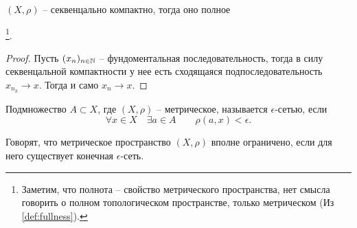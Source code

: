 \begin{theorem}
    $(X, \rho)$ -- секвенцально компактно, тогда оно полное\addtocounter{footnote}{1}\footnote{Заметим, что полнота -- свойство метрического пространства, нет смысла говорить о полном топологическом пространстве, только метрическом (Из \cref{def:fullness}).}.
\end{theorem}
\begin{proof}
    Пусть $(x_n)_{n\in\mathbb N}$ -- фундоментальная последовательность, тогда в силу секвенцальной компактности у нее есть сходящаяся подпоследовательность $x_{n_k}\to x$. Тогда и само $x_n \to x.$
\end{proof}
\begin{definition}
    Подмножество $A\subset X$, где $(X, \rho)$ -- метрическое, называется $\epsilon$-сетью, если \[\forall x \in X \quad\exists a \in A \qquad \rho(a,x) < \epsilon.\]
\end{definition}
\begin{definition}
    Говорят, что метрическое пространство $(X, \rho)$ вполне ограничено, если для него существует конечная $\epsilon$-сеть.
\end{definition}

